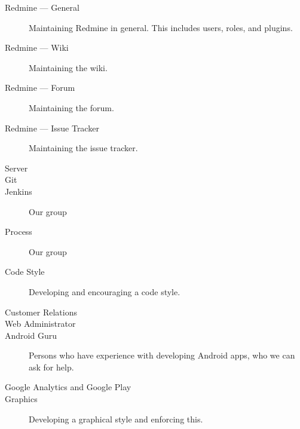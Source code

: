 \begin{description}
  \item[Redmine --- General] Maintaining Redmine in general. This includes users, roles, and plugins.
  \item[Redmine --- Wiki] Maintaining the wiki.
  \item[Redmine --- Forum] Maintaining the forum.
  \item[Redmine --- Issue Tracker] Maintaining the issue tracker.
  \item[Server] \dummy \dummy
  \item[Git] \dummy \dummy
  \item[Jenkins] Our group
  \item[Process] Our group
  \item[Code Style] Developing and encouraging a code style.
  \item[Customer Relations] 
  \item[Web Administrator] \dummy \dummy
  \item[Android Guru] Persons who have experience with developing Android apps, who we can ask for help.
  \item[Google Analytics and Google Play] \dummy \dummy
  \item[Graphics] Developing a graphical style and enforcing this.
\end{description}